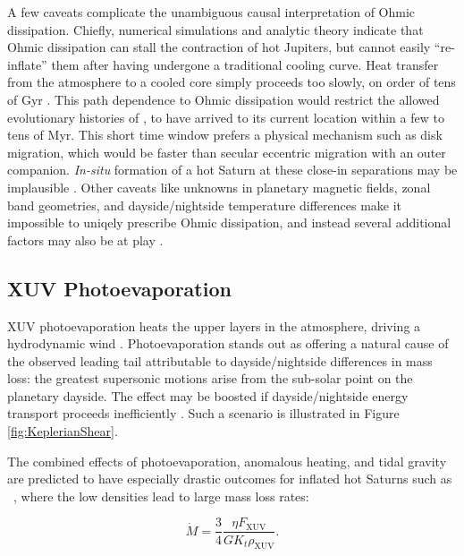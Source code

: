 \documentclass[twocolumn]{aastex631}
\newcommand{\hatp}{\object{HAT-P-67}~}
\newcommand{\hatpb}{\object{HAT-P-67 b}}
\begin{document}
A few caveats complicate the unambiguous causal interpretation of Ohmic dissipation.  Chiefly, numerical simulations \citep{2013ApJ...763...13W} and analytic theory \citep{2016ApJ...819..116G} indicate that Ohmic dissipation can stall the contraction of hot Jupiters, but cannot easily ``re-inflate'' them after having undergone a traditional cooling curve.  Heat transfer from the atmosphere to a cooled core simply proceeds too slowly, on order of tens of Gyr \citep{2016ApJ...819..116G}.  This path dependence to Ohmic dissipation would restrict the allowed evolutionary histories of \hatpb, to have arrived to its current location within a few to tens of Myr.  This short time window prefers a physical mechanism such as disk migration, which would be faster than secular eccentric migration with an outer companion. \emph{In-situ} formation of a hot Saturn at these close-in separations may be implausible \citep{2018ARA&A..56..175D}.  Other caveats like unknowns in planetary magnetic fields, zonal band geometries, and dayside/nightside temperature differences make it impossible to uniqely prescribe Ohmic dissipation, and instead several additional factors may also be at play \citep{2021A&A...645A..79S}.

\subsection{XUV Photoevaporation}
XUV photoevaporation heats the upper layers in the atmosphere, driving a hydrodynamic wind \citep{2009ApJ...693...23M}.  Photoevaporation stands out as offering a natural cause of the observed leading tail attributable to dayside/nightside differences in mass loss: the greatest supersonic motions arise from the sub-solar point on the planetary dayside.  The effect may be boosted if dayside/nightside energy transport proceeds inefficiently \citep{2009ApJ...693...23M}.  Such a scenario is illustrated in Figure \ref{fig:KeplerianShear}.

The combined effects of photoevaporation, anomalous heating, and tidal gravity are predicted to have especially drastic outcomes for inflated hot Saturns \citep{2023ApJ...945L..36T} such as \hatp, where the low densities lead to large mass loss rates:

\begin{equation}
    \dot{M} = \frac{3}{4}\frac{\eta F_\mathrm{XUV}}{G K_t \rho_\mathrm{XUV}}\label{thorn23Mdot}.
\end{equation}
\end{document}
